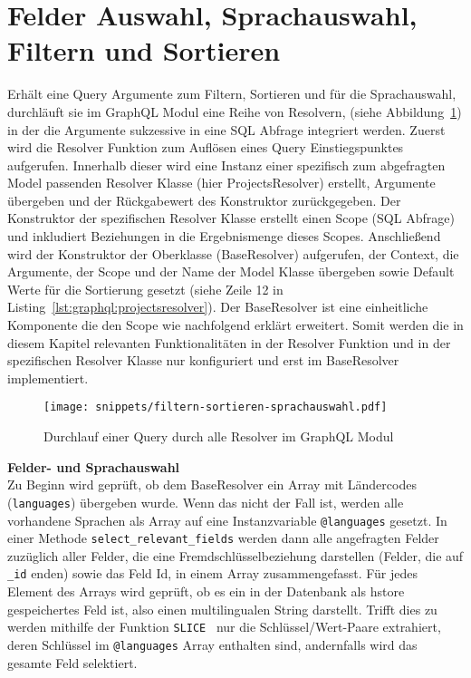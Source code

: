 \section{Felder Auswahl, Sprachauswahl, Filtern und Sortieren}
\label{impl:base-resolver}
Erhält eine Query Argumente zum Filtern, Sortieren und für die Sprachauswahl, durchläuft sie im GraphQL Modul eine Reihe von Resolvern, (siehe Abbildung~\ref{graphql:sorting}) in der die Argumente sukzessive in eine SQL Abfrage integriert werden. Zuerst wird die Resolver Funktion zum Auflösen eines Query Einstiegspunktes aufgerufen. Innerhalb dieser wird eine Instanz einer spezifisch zum abgefragten Model passenden Resolver Klasse (hier ProjectsResolver) erstellt, Argumente übergeben und der Rückgabewert des Konstruktor zurückgegeben. Der Konstruktor der spezifischen Resolver Klasse erstellt einen Scope (SQL Abfrage) und inkludiert Beziehungen in die Ergebnismenge dieses Scopes. Anschließend wird der Konstruktor der Oberklasse (BaseResolver) aufgerufen, der Context, die Argumente, der Scope und der Name der Model Klasse übergeben sowie Default Werte für die Sortierung gesetzt (siehe Zeile 12 in Listing~\ref{lst:graphql:projectsresolver}). 
Der BaseResolver ist eine einheitliche Komponente die den Scope wie nachfolgend erklärt erweitert. 
Somit werden die in diesem Kapitel relevanten Funktionalitäten in der Resolver Funktion und in der spezifischen Resolver Klasse nur konfiguriert und erst im BaseResolver implementiert.

\begin{figure}[h!]
	\centering
	\texttt{[image: snippets/filtern-sortieren-sprachauswahl.pdf]}
	\caption{Durchlauf einer Query durch alle Resolver im GraphQL Modul}
	\label{graphql:sorting}
\end{figure}


\textbf{Felder- und Sprachauswahl} \ \\
Zu Beginn wird geprüft, ob dem BaseResolver ein Array mit Ländercodes (\texttt{languages}) übergeben wurde. Wenn das nicht der Fall ist, werden alle vorhandene Sprachen als Array auf eine Instanzvariable \texttt{@languages} gesetzt. In einer Methode \texttt{select\_relevant\-\_fields} werden dann alle angefragten Felder zuzüglich aller Felder, die eine Fremdschlüsselbeziehung darstellen (Felder, die auf \texttt{\_id} enden) sowie das Feld Id, in einem Array zusammengefasst. Für jedes Element des Arrays wird geprüft, ob es ein in der Datenbank als hstore gespeichertes Feld ist, also einen multilingualen String darstellt.
Trifft dies zu werden mithilfe der Funktion \texttt{SLICE}~\cite{postgresql-hstore} nur die Schlüssel/Wert-Paare extrahiert, deren Schlüssel im \texttt{@languages} Array enthalten sind, andernfalls wird das gesamte Feld selektiert.

